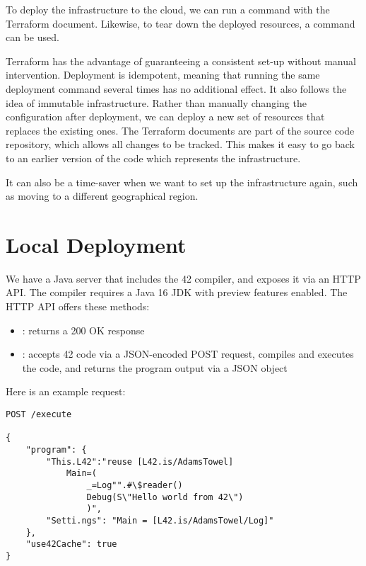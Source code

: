 
To deploy the infrastructure to the cloud, we can run a  command with the Terraform document. Likewise, to tear down the deployed resources, a  command can be used.

Terraform has the advantage of guaranteeing a consistent set-up without manual intervention. Deployment is idempotent, meaning that running the same deployment command several times has no additional effect. It also follows the idea of immutable infrastructure. Rather than manually changing the configuration after deployment, we can deploy a new set of resources that replaces the existing ones. The Terraform documents are part of the source code repository, which allows all changes to be tracked. This makes it easy to go back to an earlier version of the code which represents the infrastructure.

It can also be a time-saver when we want to set up the infrastructure again, such as moving to a different geographical region.

\section{Local Deployment}

We have a Java server that includes the 42 compiler, and exposes it via an HTTP API. The compiler requires a Java 16 JDK with preview features enabled. The HTTP API offers these methods:

\begin{itemize}
\item {}: returns a 200 OK response
\item {}: accepts 42 code via a JSON-encoded POST request, compiles and executes the code, and returns the program output via a JSON object
\end{itemize}

Here is an example request:
\begin{lstlisting}[caption=42 API Request]
POST /execute

{
    "program": {
        "This.L42":"reuse [L42.is/AdamsTowel]
            Main=(
                _=Log"".#\$reader()
                Debug(S\"Hello world from 42\")
                )",
        "Setti.ngs": "Main = [L42.is/AdamsTowel/Log]"
    },
    "use42Cache": true
}
\end{lstlisting}

